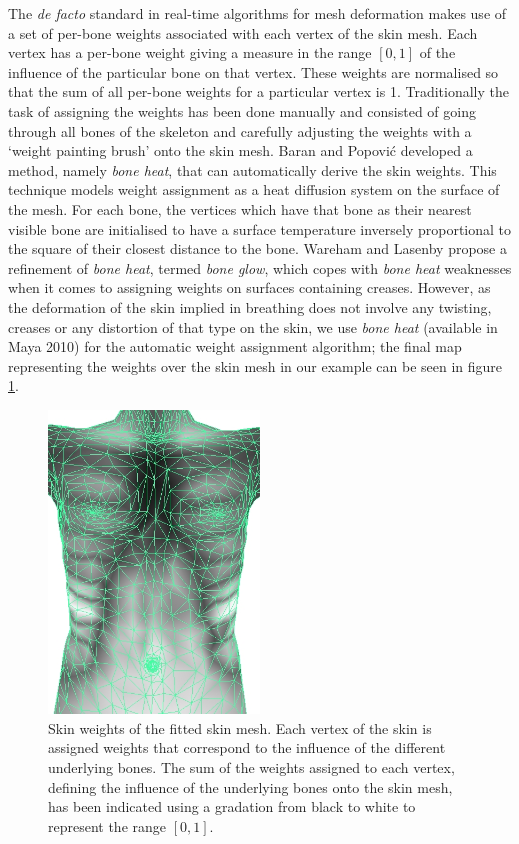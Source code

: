 The \emph{de facto} standard in real-time algorithms for mesh deformation makes use of a set of per-bone weights associated with each vertex of the skin mesh. Each vertex has a per-bone weight giving a measure in the range $[0, 1]$ of the influence of the particular bone on that vertex. These weights are normalised so that the sum of all per-bone weights for a particular vertex is 1. Traditionally the task of assigning the weights has been done manually and consisted of going through all bones of the skeleton and carefully adjusting the weights with a `weight painting brush' onto the skin mesh. Baran and Popovi{\'c} \cite{baran2007automatic} developed a method, namely \emph{bone heat}, that can automatically derive the skin weights. This technique models weight assignment as a heat diffusion system on the surface of the mesh. For each bone, the vertices which have that bone as their nearest visible bone are initialised to have a surface temperature inversely proportional to the square of their closest distance to the bone. Wareham and Lasenby \cite{wareham2008bone} propose a refinement of \emph{bone heat}, termed \emph{bone glow}, which copes with \emph{bone heat} weaknesses when it comes to assigning weights on surfaces containing creases.
However, as the deformation of the skin implied in breathing does not involve any twisting, creases or any distortion of that type on the skin, we use \emph{bone heat} (available in Maya 2010) for the automatic weight assignment algorithm; the final map representing the weights over the skin mesh in our example can be seen in figure \ref{fig:weights_map}.

\begin{figure}
	\centering
	 \includegraphics[width=0.5\textwidth]{pics/weights_map}
	\caption[Skin weights of the fitted skin mesh]{\label{fig:weights_map}Skin weights of the fitted skin mesh. Each vertex of the skin is assigned weights that correspond to the influence of the different underlying bones. The sum of the weights assigned to each vertex, defining the influence of the underlying bones onto the skin mesh, has been indicated using a gradation from black to white to represent the range $[0, 1]$.}
\end{figure}

